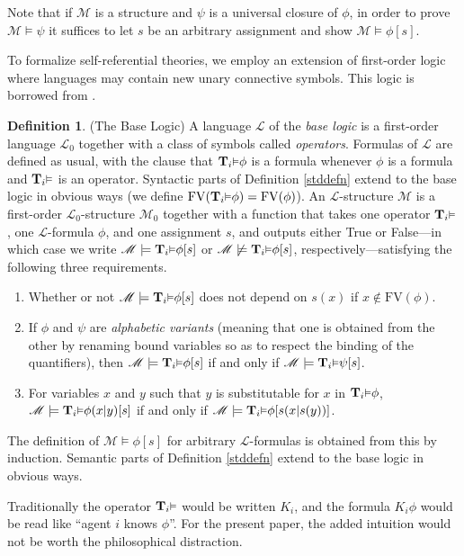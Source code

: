 \documentclass[reqno]{article}
\theoremstyle{definition}
\newtheorem{definition}[theorem]{Definition}
\def\L{\mathscr{L}}
\def\M{\mathscr{M}}
\def\T{\mathbf{T}}
\def\FV{\mathrm{FV}}
\renewcommand{\Pr}[1]{\T_{#1}\mbox{\small${\vDash}$}}
\begin{document}
Note that if $\M$ is a structure and $\psi$ is a universal closure of 
$\phi$, in order to prove $\M\models\psi$ it suffices to let $s$ be an 
arbitrary assignment and show $\M\models\phi[s]$.

To formalize self-referential theories, we employ an extension of
first-order logic where languages may contain new unary connective symbols.
This logic is borrowed from \cite{carlson2000}.

\begin{definition}
\label{baselogicdefn}
(The Base Logic)
A language $\L$ of the \emph{base logic} is a first-order language $\L_0$ together with
a class of symbols called \emph{operators}.
Formulas of $\L$ are defined as usual, with the clause that
$\Pr{i}\phi$ is a formula whenever $\phi$ is a formula and $\Pr{i}$
is an operator.
Syntactic parts of Definition \ref{stddefn} extend to the base logic in obvious
ways (we define $\FV(\Pr{i}\phi)=\FV(\phi)$).
An $\L$-structure $\M$ is a first-order $\L_0$-structure $\M_0$
together with a function that takes one operator $\Pr{i}$, one $\L$-formula
$\phi$, and one assignment $s$, and outputs either True or False---in which case we
write $\M\models\Pr{i}\phi[s]$ or $\M\not\models\Pr{i}\phi[s]$, respectively---satisfying
the following three requirements.
\begin{enumerate}
\item Whether or not $\M\models\Pr{i}\phi[s]$ does not depend on $s(x)$ if $x\not\in \FV(\phi)$.
\item If $\phi$ and $\psi$ are \emph{alphabetic variants}
(meaning
that one is obtained from the other by renaming bound variables so as to respect the binding of
the quantifiers), then $\M\models\Pr{i}\phi[s]$ if and only if $\M\models\Pr{i}\psi[s]$.
\item For variables $x$ and $y$ such that $y$ is substitutable for $x$
in $\Pr{i}\phi$, $\M\models\Pr{i}\phi(x|y)[s]$ if and only if $\M\models \Pr{i}\phi[s(x|s(y))]$.
\end{enumerate}
The definition of $\M\models\phi[s]$ for arbitrary $\L$-formulas is obtained from this by induction.
Semantic parts of Definition \ref{stddefn} extend to the base logic in obvious ways.
\end{definition}

Traditionally the operator $\Pr i$ would be written $K_i$, and the formula $K_i\phi$ would be
read like ``agent $i$ knows $\phi$''.  For the present paper, the added intuition would not be
worth the philosophical distraction.
\end{document}
